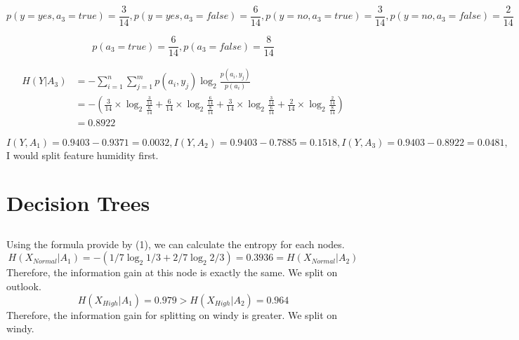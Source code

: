 \documentclass{article}
\begin{document}
\begin{equation*}
    p(y = yes, a_3 = true) = \frac{3}{14}, p(y = yes, a_3 = false) = \frac{6}{14},p(y = no, a_3 = true) = \frac{3}{14}, p(y = no, a_3 = false) = \frac{2}{14}
\end{equation*}

\begin{equation*}
    p(a_3 = true) = \frac{6}{14}, p(a_3 = false) = \frac{8}{14}
\end{equation*}

\begin{equation}
\begin{split}
    H(Y|A_3)     &= - \sum_{i = 1}^n \sum_{j = 1}^m p(a_i,y_j) \log_2 \frac{p(a_i,y_j)}{p(a_i)} \\
    &= -(\frac{3}{14} \times \log_2 \frac{\frac{3}{14}}{\frac{6}{14}} + \frac{6}{14} \times \log_2 \frac{\frac{6}{14}}{\frac{8}{14}} + \frac{3}{14} \times \log_2 \frac{\frac{3}{14}}{\frac{6}{14}} + \frac{2}{14} \times \log_2 \frac{\frac{2}{14}}{\frac{8}{14}}) \\
    &= 0.8922
\end{split}
\end{equation}

\begin{equation}
    I(Y, A_1) = 0.9403-0.9371 = 0.0032,
    I(Y, A_2) = 0.9403-0.7885 = 0.1518,
    I(Y, A_3) = 0.9403-0.8922 = 0.0481,
\end{equation}
I would split feature humidity first.

\section{Decision Trees}
\subsection{}
Using the formula provide by (1), we can calculate the entropy for each nodes.
\begin{equation}
    H(X_{Normal} | A_1) = -(1/7 \log_2 1/3 + 2/7 \log_2 2/3) = 0.3936 = H(X_{Normal} | A_2)
\end{equation}
Therefore, the information gain at this node is exactly the same. We split on outlook.
\begin{equation}
    H(X_{High} | A_1) = 0.979 >  H(X_{High} | A_2) = 0.964
\end{equation}
Therefore, the information gain for splitting on windy is greater. We split on windy. \\
\end{document}
